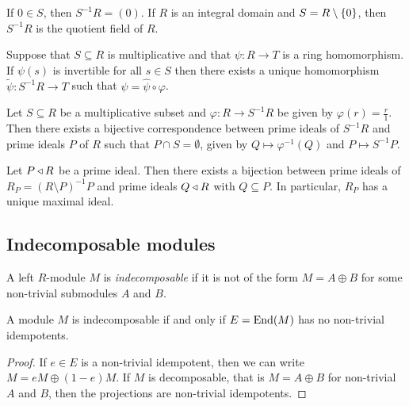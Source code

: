 \begin{opomba}
If $0 \in S$, then $S^{-1} R = (0)$. If $R$ is an integral domain
and $S = R \setminus \left\{0\right\}$, then $S^{-1} R$ is the quotient
field of $R$.
\end{opomba}

\begin{trditev}
Suppose that $S \subseteq R$ is multiplicative and that
$\psi \colon R \to T$ is a ring homomorphism. If $\psi(s)$ is
invertible for all $s \in S$ then there exists a unique
homomorphism $\widetilde{\psi} \colon S^{-1} R \to T$ such that
$\psi = \widehat{\psi} \circ \varphi$.
\end{trditev}

\begin{trditev}
Let $S \subseteq R$ be a multiplicative subset and
$\varphi \colon R \to S^{-1} R$ be given by
$\varphi(r) = \frac{r}{1}$. Then there exists a bijective
correspondence between prime ideals of $S^{-1} R$ and prime ideals
$P$ of $R$ such that $P \cap S = \emptyset$, given by
$Q \mapsto \varphi^{-1}(Q)$ and $P \mapsto S^{-1}P$.
\end{trditev}

\begin{posledica}
Let $P \triangleleft R$ be a prime ideal. Then there exists a bijection
between prime ideals of $R_P = (R \setminus P)^{-1} P$ and prime
ideals $Q \triangleleft R$ with $Q \subseteq P$. In particular, $R_P$ has a
unique maximal ideal.
\end{posledica}

\newpage

\subsection{Indecomposable modules}

\begin{definicija}
A left $R$-module $M$ is
\emph{indecomposable} if it is not of
the form $M = A \oplus B$ for some non-trivial submodules $A$ and
$B$.
\end{definicija}

\begin{lema}
A module $M$ is indecomposable if and only if $E = \operatorname{End}(M)$ has no
non-trivial idempotents.
\end{lema}

\begin{proof}
If $e \in E$ is a non-trivial idempotent, then we can write
$M = eM \oplus (1-e)M$. If $M$ is decomposable, that is
$M = A \oplus B$ for non-trivial $A$ and $B$, then the projections
are non-trivial idempotents.
\end{proof}

